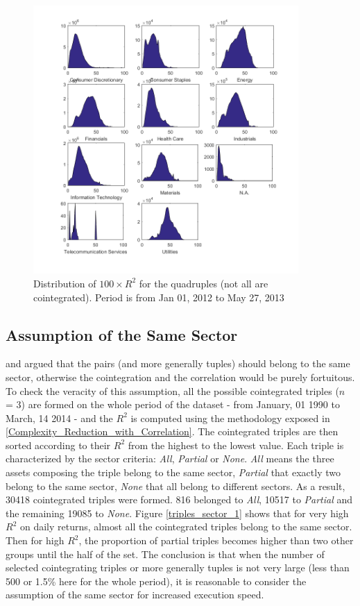 \documentclass[11pt,a4,twosided,singlespacing,titlepagenumber=on]{scrreprt}
\numberwithin{equation}{chapter} %
\theoremstyle{remark}
\begin{document}
\begin{figure}[H]
\centering
\includegraphics[width = 0.9\textwidth]{R2_ret_Quads_Jan_1_2012_Mar_27_2013}
\caption{Distribution of $100 \times R^2$ for the quadruples (not all are cointegrated). Period is from Jan 01, 2012 to May 27, 2013}
\label{dist_100_r2_quad}
\end{figure}

\subsection{Assumption of the Same Sector}
\cite{chan2009} and \cite{dunis2010} argued that the pairs (and more generally tuples) should belong to the same sector, otherwise the cointegration and the correlation would be purely fortuitous. To check the veracity of this assumption, all the possible cointegrated triples ($n$ = 3) are formed on the whole period of the dataset  - from January, 01 1990 to March, 14 2014 - and the $R^2$ is computed using the methodology exposed in \ref{Complexity_Reduction_with_Correlation}. The cointegrated triples are then sorted according to their $R^2$ from the highest to the lowest value. Each triple is characterized by the sector criteria: \textit{All}, \textit{Partial} or \textit{None}. \textit{All} means the three assets composing the triple belong to the same sector, \textit{Partial} that exactly two belong to the same sector, \textit{None} that all belong to different sectors. As a result, 30418 cointegrated triples were formed. 816 belonged to \textit{All}, 10517 to \textit{Partial} and the remaining 19085 to \textit{None}. Figure \ref{triples_sector_1} shows that for very high $R^2$ on daily returns, almost all the cointegrated triples belong to the same sector. Then for high $R^2$, the proportion of partial triples becomes higher than two other groups until the half of the set. The conclusion is that when the number of selected cointegrating triples or more generally tuples is not very large (less than 500 or 1.5\% here for the whole period), it is reasonable to consider the assumption of the same sector for increased execution speed.
\end{document}
